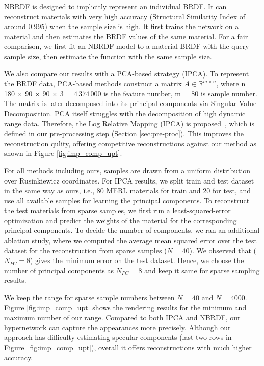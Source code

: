 NBRDF \cite{sztrajman2021neural} is designed to implicitly represent an individual BRDF. It can reconstruct materials with very high accuracy (Structural Similarity Index of around 0.995) when the sample size is high. It first trains the network on a material and then estimates the BRDF values of the same material. For a fair comparison, we first fit an NBRDF model to a material BRDF with the query sample size, then estimate the function with the same sample size. 

We also compare our results with a PCA-based strategy (IPCA). To represent the BRDF data, PCA-based methods  \cite{matusik2003data, ngan2006image} construct a matrix ${A} \in \mathbb{R}^{m \times n}$, where n = 180 × 90 × 90 × 3 = $4\,374\,000$ is the feature number, m = 80 is sample number. The matrix is later decomposed into its principal components via Singular Value Decomposition. PCA itself struggles with the decomposition of high dynamic range data. Therefore, the Log Relative Mapping (IPCA) is proposed~\cite{nielsen2015optimal}, which is defined in our pre-processing step (Section \ref{sec:pre-proc}). This improves the reconstruction qulity, offering competitive reconstructions against our method as shown in Figure \ref{fig:imp_comp_upt}.


For all methods including ours, samples are drawn from a uniform distribution over Rusinkiewicz coordinates. For IPCA results, we split train and test dataset in the same way as ours, i.e., 80 MERL materials for train and 20 for test, and use all available samples for learning the principal components. To reconstruct the test materials from sparse samples, we first run a least-squared-error optimization and predict the weights of the material for the corresponding principal components. To decide the number of components, we ran an additional ablation study, where 
we computed the average mean squared error over the test dataset for the reconstruction from sparse samples ($N = 40$). We observed that ($N_{PC} = 8$) gives the minimum error on the test dataset. Hence, we choose the number of principal components as $N_{PC} = 8$ and keep it same for sparse sampling results.

 
We keep the range for sparse sample numbers between $N = 40$ and $N = 4000$. Figure \ref{fig:imp_comp_upt} shows the rendering results for the minimum and maximum number of our range. Compared to both IPCA and NBRDF, our hypernetwork can capture the appearances more precisely. Although our approach has difficulty estimating specular components (last two rows in Figure~\ref{fig:imp_comp_upt}), overall it offers reconstructions with much higher accuracy.

